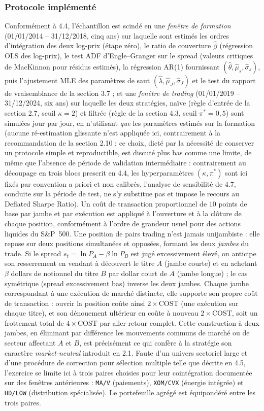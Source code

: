 \documentclass{article}
\begin{document}
\subsubsection*{Protocole implémenté}
Conformément à 4.4, l'échantillon est scindé en une \emph{fenêtre de formation} (01/01/2014 -- 31/12/2018, cinq ans) sur laquelle sont estimés les ordres d'intégration des deux log-prix (étape zéro), le ratio de couverture $\hat\beta$ (régression OLS des log-prix), le test ADF d'Engle--Granger sur le spread (valeurs critiques de MacKinnon pour résidus estimés), la régression AR(1) fournissant $(\hat\theta,\hat\mu_s,\hat\sigma_s)$, puis l'ajustement MLE des paramètres de saut $(\hat\lambda,\hat\mu_J,\hat\sigma_J)$ et le test du rapport de vraisemblance de la section 3.7 ; et une \emph{fenêtre de trading} (01/01/2019 -- 31/12/2024, six ans) sur laquelle les deux stratégies, naïve (règle d'entrée de la section 2.7, seuil $\kappa=2$) et filtrée (règle de la section 4.3, seuil $\pi^\ast=0{,}5$) sont simulées jour par jour, en n'utilisant \emph{que} les paramètres estimés sur la formation (aucune ré-estimation glissante n'est appliquée ici, contrairement à la recommandation de la section 2.10 ; ce choix, dicté par la nécessité de conserver un protocole simple et reproductible, est discuté plus bas comme une limite, de même que l'absence de période de validation intermédiaire : contrairement au découpage en trois blocs prescrit en 4.4, les hyperparamètres $(\kappa,\pi^\ast)$ sont ici fixés par convention a priori et non calibrés, l'analyse de sensibilité de 4.7, conduite sur la période de test, ne s'y substitue pas et impose le recours au Deflated Sharpe Ratio). Un coût de transaction proportionnel de $10$ points de base par jambe et par exécution est appliqué à l'ouverture et à la clôture de chaque position, conformément à l'ordre de grandeur usuel pour des actions liquides du S\&P~500.
Une position de pairs trading n'est jamais unijambiste : elle repose sur deux positions simultanées et opposées, formant les deux \emph{jambes} du trade. Si le spread $s_t=\ln P_A-\beta\ln P_B$ est jugé excessivement élevé, on anticipe son resserrement en vendant à découvert le titre $A$ (jambe courte) et en achetant $\beta$ dollars de notionnel du titre $B$ par dollar court de $A$ (jambe longue) ; le cas symétrique (spread excessivement bas) inverse les deux jambes. Chaque jambe correspondant à une exécution de marché distincte, elle supporte son propre coût de transaction : ouvrir la position coûte ainsi $2\times\text{COST}$ (une exécution sur chaque titre), et son dénouement ultérieur en coûte à nouveau $2\times\text{COST}$, soit un frottement total de $4\times\text{COST}$ par aller-retour complet. Cette construction à deux jambes, en éliminant par différence les mouvements communs de marché ou de secteur affectant $A$ et $B$, est précisément ce qui confère à la stratégie son caractère \emph{market-neutral} introduit en 2.1.
Faute d'un univers sectoriel large et d'une procédure de correction pour sélection multiple telle que décrite en 4.5, l'exercice se limite ici à trois paires choisies pour leur cointégration documentée sur des fenêtres antérieures : \texttt{MA/V} (paiements), \texttt{XOM/CVX} (énergie intégrée) et \texttt{HD/LOW} (distribution spécialisée). Le portefeuille agrégé est équipondéré entre les trois paires.
\end{document}
